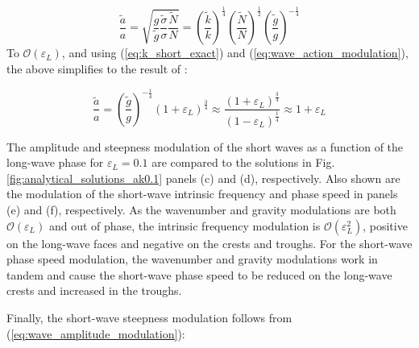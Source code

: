 \documentclass[lineno]{jfm}
\begin{document}
\begin{equation}
\label{eq:wave_amplitude_modulation}
\dfrac{\widetilde{a}}{a} = \sqrt{
  \dfrac{g}{\widetilde{g}}
  \dfrac{\widetilde{\sigma}}{\sigma}
  \dfrac{\widetilde{N}}{N}}
=
  \left( \dfrac{\widetilde{k}}{k} \right)^{\frac{1}{4}}
  \left( \dfrac{\widetilde{N}}{N} \right)^{\frac{1}{2}}
  \left( \dfrac{\widetilde{g}}{g} \right)^{-\frac{1}{4}}
\end{equation}
To $\mathcal{O}(\varepsilon_L)$, and using (\ref{eq:k_short_exact})
and (\ref{eq:wave_action_modulation}), the above simplifies to the result of
\citet{longuet1960changes}:

\begin{equation}
\label{eq:wave_amplitude_modulation_order1}
\dfrac{\widetilde{a}}{a} = 
  \left( \dfrac{\widetilde{g}}{g} \right)^{-\frac{1}{4}}
  \left( 1 + \varepsilon_L \right)^{\frac{3}{4}}
  \approx \frac{(1 + \varepsilon_L)^{\frac{3}{4}}}{(1 - \varepsilon_L)^{\frac{1}{4}}}
  \approx 1 + \varepsilon_L
\end{equation}

The amplitude and steepness modulation of the short waves as a function of the
long-wave phase for $\varepsilon_L = 0.1$ are compared to the
\citet{longuet1960changes} solutions in Fig.
\ref{fig:analytical_solutions_ak0.1} panels (c) and (d), respectively.
Also shown are the modulation of the short-wave intrinsic frequency and phase
speed in panels (e) and (f), respectively.
As the wavenumber and gravity modulations are both $\mathcal{O}(\varepsilon_L)$
and out of phase, the intrinsic frequency modulation is
$\mathcal{O}(\varepsilon_L^2)$, positive on the long-wave faces and negative
on the crests and troughs.
For the short-wave phase speed modulation, the wavenumber and gravity modulations
work in tandem and cause the short-wave phase speed to be reduced on the long-wave
crests and increased in the troughs.

Finally, the short-wave steepness modulation follows from (\ref{eq:wave_amplitude_modulation}):
\end{document}
